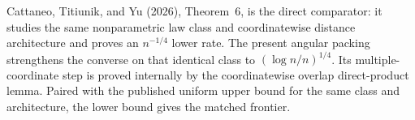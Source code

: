 Cattaneo, Titiunik, and Yu (2026), Theorem~6, is the direct comparator: it studies the same nonparametric law class and coordinatewise distance architecture and proves an \(n^{-1/4}\) lower rate.  The present angular packing strengthens the converse on that identical class to \((\log n/n)^{1/4}\).  Its multiple-coordinate step is proved internally by the coordinatewise overlap direct-product lemma.  Paired with the published uniform upper bound for the same class and architecture, the lower bound gives the matched frontier.